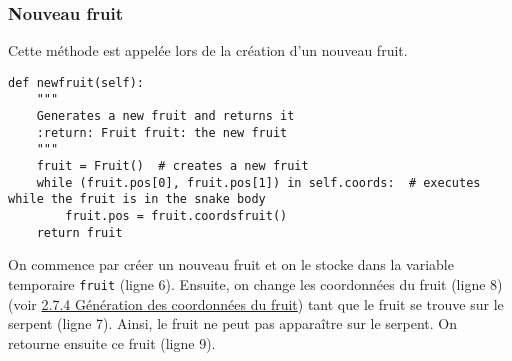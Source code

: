 \documentclass[12pt, a4paper, openany]{book}
\begin{document}
\subsubsection{Nouveau fruit}
\label{r:2.7.3-fru}
Cette méthode est appelée lors de la création d'un nouveau fruit.
\begin{verbatim}
def newfruit(self):
    """
    Generates a new fruit and returns it
    :return: Fruit fruit: the new fruit
    """
    fruit = Fruit()  # creates a new fruit
    while (fruit.pos[0], fruit.pos[1]) in self.coords:  # executes while the fruit is in the snake body
        fruit.pos = fruit.coordsfruit()
    return fruit
\end{verbatim}
On commence par créer un nouveau fruit et on le stocke dans la variable temporaire \verb'fruit' (ligne 6). Ensuite, on change les coordonnées du fruit (ligne 8) (voir \hyperref[r:2.7.4-coo]{2.7.4 Génération des coordonnées du fruit}) tant que le fruit se trouve sur le serpent (ligne 7). Ainsi, le fruit ne peut pas apparaître sur le serpent. On retourne ensuite ce fruit (ligne 9).
\end{document}
